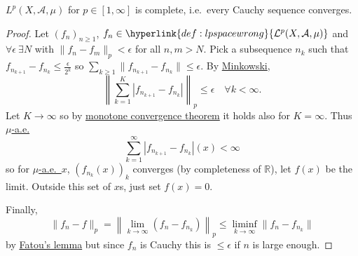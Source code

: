 \documentclass{article}
\newcommand{\1}[1]{\mathbbm{1}_{#1}}
\begin{document}
\begin{prop}
    \hyperlink{def:lpspace}{$L^p(X, \mathcal{A},\mu)$} for $p \in [1,\infty]$ is complete, i.e.\ every Cauchy sequence converges.
\end{prop}
\begin{proof}
    Let $(f_n)_{n \geq 1}$, $f_n \in \hyperlink{def:lpspacewrong}{\mathcal{L}^p(X, \mathcal{A},\mu)}$ and $\forall \epsilon\ \exists N$ with $\|f_n - f_m\|_p < \epsilon$ for all $n,m > N$.
    Pick a subsequence $n_k$ such that $f_{n_{k+1}} - f_{n_k} \leq \frac{\epsilon}{2^k}$ so $\sum_{k \geq 1} \|f_{n_{k+1}}-f_{n_k}\| \leq \epsilon$.
    By \hyperlink{prop:mink}{Minkowski},
    \begin{equation*}
        \left\|\sum_{k=1}^K \left|f_{n_{k+1}} - f_{n_k}\right| \right\|_p \leq \epsilon \quad \forall k < \infty.
    \end{equation*}
    Let $K \to \infty$ so by \hyperlink{def:monConv}{monotone convergence theorem} it holds also for $K = \infty$.
    Thus \hyperlink{def:ae}{$\mu$-a.e.}
    \begin{equation*}
        \sum_{k=1}^\infty \left|f_{n_{k+1}} - f_{n_k}\right|(x) < \infty
    \end{equation*}
    so for \hyperlink{def:ae}{$\mu$-a.e.\ }$x$, $(f_{n_k}(x))_k$ converges (by completeness of $\mathbb{R}$), let $f(x)$ be the limit.
    Outside this set of $x$s, just set $f(x) = 0$.

    Finally,
    \begin{equation*}
        \|f_n-f\|_p = \left\|\lim_{k \to \infty} (f_n - f_{n_k})\right\|_p \leq \liminf_{k \to \infty} \|f_n - f_{n_k}\|
    \end{equation*}
    by \hyperlink{thm:fatou}{Fatou's lemma} but since $f_n$ is Cauchy this is $\leq \epsilon$ if $n$ is large enough.
\end{proof}
\end{document}
